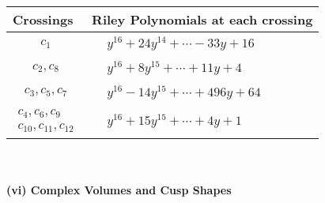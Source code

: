\documentclass[1p]{elsarticle_modified}
\theoremstyle{definition}
\begin{document}
\begin{tabular}{m{50pt}|m{274pt}}
Crossings & \hspace{64pt}Riley Polynomials at each crossing \\
\hline $$\begin{aligned}c_{1}\end{aligned}$$&$\begin{aligned}
&y^{16}+24 y^{14}+\cdots-33 y+16
\end{aligned}$\\
\hline $$\begin{aligned}c_{2},c_{8}\end{aligned}$$&$\begin{aligned}
&y^{16}+8 y^{15}+\cdots+11 y+4
\end{aligned}$\\
\hline $$\begin{aligned}c_{3},c_{5},c_{7}\end{aligned}$$&$\begin{aligned}
&y^{16}-14 y^{15}+\cdots+496 y+64
\end{aligned}$\\
\hline $$\begin{aligned}c_{4},c_{6},c_{9}\\c_{10},c_{11},c_{12}\end{aligned}$$&$\begin{aligned}
&y^{16}+15 y^{15}+\cdots+4 y+1
\end{aligned}$\\
\hline
\end{tabular}\\~\\
\newpage\flushleft \textbf{(vi) Complex Volumes and Cusp Shapes}
\end{document}
